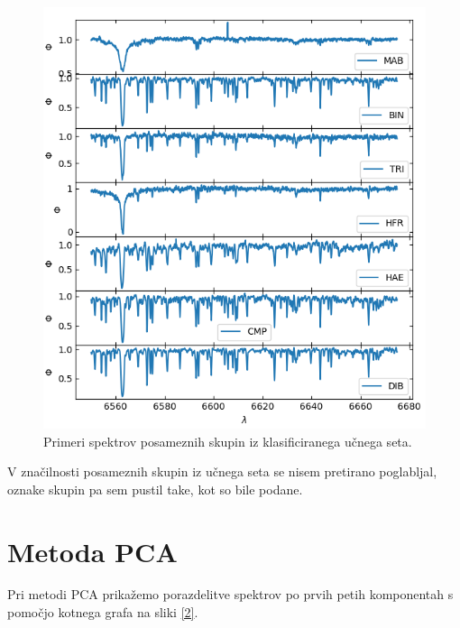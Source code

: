 \documentclass[11pt,a4paper]{article}
\begin{document}
\begin{figure}[h]
    \centering
    \hbox{\hspace{5em}\includegraphics[scale=0.9]{spektri_vizualno}}
    \caption{Primeri spektrov posameznih skupin iz klasificiranega učnega seta.}
    \label{1}
\end{figure}

V značilnosti posameznih skupin iz učnega seta se nisem pretirano poglabljal, oznake skupin pa sem pustil take, kot so bile podane.

\clearpage

\section{Metoda PCA}

Pri metodi PCA prikažemo porazdelitve spektrov po prvih petih komponentah s pomočjo kotnega grafa na sliki \ref{2}.
\end{document}
